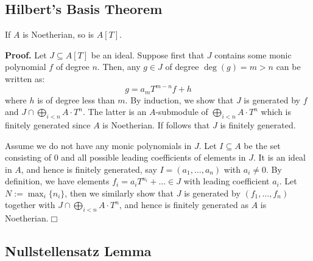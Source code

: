 \documentclass{template}
\newcommand{\qedwhite}{\hfill \ensuremath{\Box}}
\begin{document}
\subsection{Hilbert's Basis Theorem}

\begin{theorem}
    If $A$ is Noetherian, so is $A[T]$.
\end{theorem}

\textbf{Proof.} Let $J \subseteq A[T]$ be an ideal. Suppose first that $J$
contains some monic polynomial $f$ of degree $n$. Then, any $g \in J$ of degree
$\deg(g) = m > n$ can be written as:
\begin{equation*}
    g = a_mT^{m-n}f + h
\end{equation*}
where $h$ is of degree less than $m$. By induction, we show that $J$ is
generated by $f$ and $J \cap \bigoplus_{i<n}A\cdot T^n$. The latter is an
$A$-submodule of $\bigoplus_{i<n}A\cdot T^n$ which is finitely generated since
$A$ is Noetherian. If follows that $J$ is finitely generated.

Assume we do not have any monic polynomials in $J$. Let $I \subseteq A$ be the
set consisting of $0$ and all possible leading coefficients of elements in $J$.
It is an ideal in $A$, and hence is finitely generated, say $I=(a_1,\dots,a_n)$
with $a_i \neq 0$. By definition, we have elements $f_i=a_iT^{n_i}+\dots \in J$
with leading coefficient $a_i$. Let $N := \max_i\{n_i\}$, then we similarly show
that $J$ is generated by $(f_1,\dots,f_n)$ together with $J \cap
\bigoplus_{i<n}A \cdot T^n$, and hence is finitely generated as $A$ is
Noetherian.\qedwhite

\subsection{Nullstellensatz Lemma}
\end{document}
